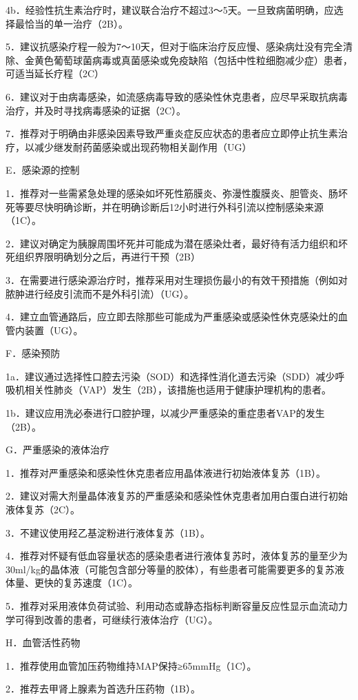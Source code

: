 4b．经验性抗生素治疗时，建议联合治疗不超过3～5天。一旦致病菌明确，应选择最恰当的单一治疗（2B）。

5．建议抗感染疗程一般为7～10天，但对于临床治疗反应慢、感染病灶没有完全清除、金黄色葡萄球菌病毒或真菌感染或免疫缺陷（包括中性粒细胞减少症）患者，可适当延长疗程（2C）

6．建议对于由病毒感染，如流感病毒导致的感染性休克患者，应尽早采取抗病毒治疗，并及时寻找病毒感染的证据（2C）。

7．推荐对于明确由非感染因素导致严重炎症反应状态的患者应立即停止抗生素治疗，以减少继发耐药菌感染或出现药物相关副作用（UG）

E．感染源的控制

1．推荐对一些需紧急处理的感染如坏死性筋膜炎、弥漫性腹膜炎、胆管炎、肠坏死等要尽快明确诊断，并在明确诊断后12小时进行外科引流以控制感染来源（1C）。

2．建议对确定为胰腺周围坏死并可能成为潜在感染灶者，最好待有活力组织和坏死组织界限明确划分之后，再进行干预（2B）

3．在需要进行感染源治疗时，推荐采用对生理损伤最小的有效干预措施（例如对脓肿进行经皮引流而不是外科引流）（UG）。

4．建立血管通路后，应立即去除那些可能成为严重感染或感染性休克感染灶的血管内装置（UG）。

F．感染预防

1a．建议通过选择性口腔去污染（SOD）和选择性消化道去污染（SDD）减少呼吸机相关性肺炎（VAP）发生（2B），该措施也适用于健康护理机构的患者。

1b．建议应用洗必泰进行口腔护理，以减少严重感染的重症患者VAP的发生（2B）。

G．严重感染的液体治疗

1．推荐对严重感染和感染性休克患者应用晶体液进行初始液体复苏（1B）。

2．建议对需大剂量晶体液复苏的严重感染和感染性休克患者加用白蛋白进行初始液体复苏（2C）。

3．不建议使用羟乙基淀粉进行液体复苏（1B）。

4．推荐对怀疑有低血容量状态的感染患者进行液体复苏时，液体复苏的量至少为30ml/kg的晶体液（可能包含部分等量的胶体），有些患者可能需要更多的复苏液体量、更快的复苏速度（1C）。

5．推荐对采用液体负荷试验、利用动态或静态指标判断容量反应性显示血流动力学可得到改善的患者，可继续行液体治疗（UG）。

H．血管活性药物

1．推荐使用血管加压药物维持MAP保持≥65mmHg（1C）。

2．推荐去甲肾上腺素为首选升压药物（1B）。

